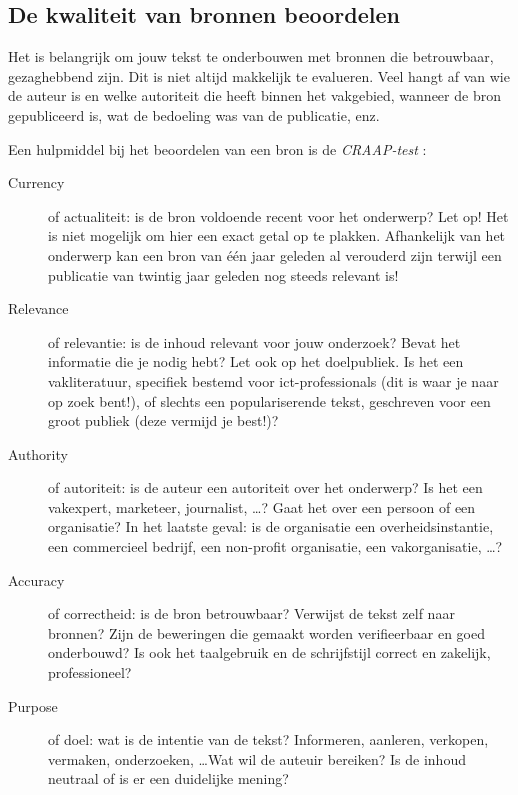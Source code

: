 \subsection{De kwaliteit van bronnen beoordelen}%
\label{sub:de-kwaliteit-van-bronnen-beoordelen}

Het is belangrijk om jouw tekst te onderbouwen met bronnen die betrouwbaar, gezaghebbend zijn. Dit is niet altijd makkelijk te evalueren. Veel hangt af van wie de auteur is en welke autoriteit die heeft binnen het vakgebied, wanneer de bron gepubliceerd is, wat de bedoeling was van de publicatie, enz.

Een hulpmiddel bij het beoordelen van een bron is de \emph{CRAAP-test} \autocite{Blakeslee2004}:

\begin{description}
  \item[Currency] of actualiteit: is de bron voldoende recent voor het onderwerp? Let op! Het is niet mogelijk om hier een exact getal op te plakken. Afhankelijk van het onderwerp kan een bron van één jaar geleden al verouderd zijn terwijl een publicatie van twintig jaar geleden nog steeds relevant is!

  \item[Relevance] of relevantie: is de inhoud relevant voor jouw onderzoek? Bevat het informatie die je nodig hebt? Let ook op het doelpubliek. Is het een vakliteratuur, specifiek bestemd voor ict-professionals (dit is waar je naar op zoek bent!), of slechts een populariserende tekst, geschreven voor een groot publiek (deze vermijd je best!)?

  \item[Authority] of autoriteit: is de auteur een autoriteit over het onderwerp? Is het een vakexpert, marketeer, journalist, \ldots? Gaat het over een persoon of een organisatie? In het laatste geval: is de organisatie een overheidsinstantie, een commercieel bedrijf, een non-profit organisatie, een vakorganisatie, \ldots?

  \item[Accuracy] of correctheid: is de bron betrouwbaar? Verwijst de tekst zelf naar bronnen? Zijn de beweringen die gemaakt worden verifieerbaar en goed onderbouwd? Is ook het taalgebruik en de schrijfstijl correct en zakelijk, professioneel?

  \item[Purpose] of doel: wat is de intentie van de tekst? Informeren, aanleren, verkopen, vermaken, onderzoeken, \ldots Wat wil de auteuir bereiken? Is de inhoud neutraal of is er een duidelijke mening?
\end{description}

